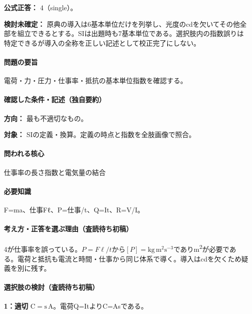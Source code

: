 \textbf{公式正答：} 4（single）。

\par\textbf{検討未確定：} 原典の導入は6基本単位だけを列挙し、光度のcdを欠いてその他全部を組立できるとする。SIは出題時も7基本単位である。選択肢内の指数誤りは特定できるが導入の全称を正しい記述として校正完了にしない。

\paragraph{問題の要旨} 電荷・力・圧力・仕事率・抵抗の基本単位指数を確認する。

\paragraph{確認した条件・記述（独自要約）}\mbox{}\par

\noindent\textbf{方向：} 最も不適切なもの。\par

\noindent\textbf{対象：} SIの定義・換算。定義の時点と指数を全肢画像で照合。\par

\paragraph{問われる核心} 仕事率の長さ指数と電気量の結合

\paragraph{必要知識} F=\allowbreak{}ma、仕事Fℓ、P=仕事/t、Q=\allowbreak{}It、R=\allowbreak{}V/I。

\paragraph{考え方・正答を選ぶ理由（査読待ち初稿）} 4が仕事率を誤っている。\(P=F\ell/t\)から\([P]=\mathrm{kg\,m^2s^{-3}}\)でありm\textsuperscript{2}が必要である。電荷と抵抗も電流と時間・仕事から同じ体系で導く。導入はcdを欠くため疑義を別に残す。

\paragraph{選択肢の検討（査読待ち初稿）}\mbox{}\par

\noindent\textbf{1：適切} \(\mathrm{C=s\,A}\)。電荷Q=\allowbreak{}ItよりC=\allowbreak{}Asである。\par

